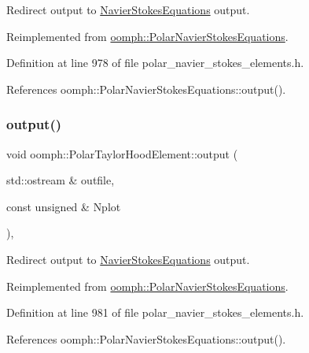 Redirect output to \hyperlink{classoomph_1_1NavierStokesEquations}{Navier\+Stokes\+Equations} output. 



Reimplemented from \hyperlink{classoomph_1_1PolarNavierStokesEquations_a720f9b13abd3bf876793f1f9e8538f61}{oomph\+::\+Polar\+Navier\+Stokes\+Equations}.



Definition at line 978 of file polar\+\_\+navier\+\_\+stokes\+\_\+elements.\+h.



References oomph\+::\+Polar\+Navier\+Stokes\+Equations\+::output().

\mbox{\label{classoomph_1_1PolarTaylorHoodElement_acca69fdd471868d493ec2087f81a7188}} 
\subsubsection{\texorpdfstring{output()}{output()}\hspace{0.1cm}{\footnotesize\ttfamily [2/4]}}
{\footnotesize\ttfamily void oomph\+::\+Polar\+Taylor\+Hood\+Element\+::output (\begin{DoxyParamCaption}\item[{std\+::ostream \&}]{outfile,  }\item[{const unsigned \&}]{Nplot }\end{DoxyParamCaption})\hspace{0.3cm}{\ttfamily [inline]}, {\ttfamily [virtual]}}



Redirect output to \hyperlink{classoomph_1_1NavierStokesEquations}{Navier\+Stokes\+Equations} output. 



Reimplemented from \hyperlink{classoomph_1_1PolarNavierStokesEquations_a830bb7a0fc6532994fd1e173f7803d54}{oomph\+::\+Polar\+Navier\+Stokes\+Equations}.



Definition at line 981 of file polar\+\_\+navier\+\_\+stokes\+\_\+elements.\+h.



References oomph\+::\+Polar\+Navier\+Stokes\+Equations\+::output().

